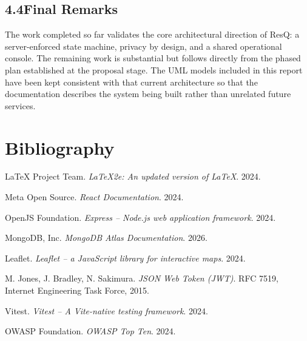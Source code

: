\documentclass[11pt,a4paper]{article}
\begin{document}
\subsection{4.4\quad Final Remarks}

The work completed so far validates the core architectural direction of ResQ: a server-enforced state machine, privacy by design, and a shared operational console. The remaining work is substantial but follows directly from the phased plan established at the proposal stage. The UML models included in this report have been kept consistent with that current architecture so that the documentation describes the system being built rather than unrelated future services.

\newpage

\section*{Bibliography}

\begin{enumerate}[label={[}\arabic*{]},leftmargin=0.34in]
\item LaTeX Project Team. \textit{LaTeX2e: An updated version of LaTeX}. 2024.
\item Meta Open Source. \textit{React Documentation}. 2024.
\item OpenJS Foundation. \textit{Express -- Node.js web application framework}. 2024.
\item MongoDB, Inc. \textit{MongoDB Atlas Documentation}. 2026.
\item Leaflet. \textit{Leaflet -- a JavaScript library for interactive maps}. 2024.
\item M. Jones, J. Bradley, N. Sakimura. \textit{JSON Web Token (JWT)}. RFC 7519, Internet Engineering Task Force, 2015.
\item Vitest. \textit{Vitest -- A Vite-native testing framework}. 2024.
\item OWASP Foundation. \textit{OWASP Top Ten}. 2024.
\end{enumerate}
\end{document}
